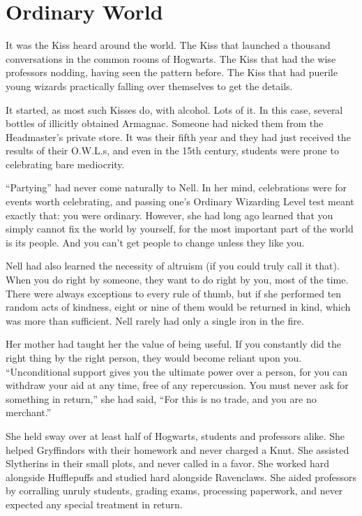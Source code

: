 \chapter{Ordinary World}


It was the Kiss heard around the world. The Kiss that launched a thousand conversations in the common rooms of Hogwarts. The Kiss that had the wise professors nodding, having seen the pattern before. The Kiss that had puerile young wizards practically falling over themselves to get the details.

It started, as most such Kisses do, with alcohol. Lots of it. In this case, several bottles of illicitly obtained Armagnac. Someone had nicked them from the Headmaster’s private store. It was their fifth year and they had just received the results of their O.W.L.s, and even in the 15th century, students were prone to celebrating bare mediocrity.

“Partying” had never come naturally to Nell. In her mind, celebrations were for events worth celebrating, and passing one’s Ordinary Wizarding Level test meant exactly that: you were ordinary. However, she had long ago learned that you simply cannot fix the world by yourself, for the most important part of the world is its people. And you can’t get people to change unless they like you.

Nell had also learned the necessity of altruism (if you could truly call it that). When you do right by someone, they want to do right by you, most of the time. There were always exceptions to every rule of thumb, but if she performed ten random acts of kindness, eight or nine of them would be returned in kind, which was more than sufficient. Nell rarely had only a single iron in the fire.

Her mother had taught her the value of being useful. If you constantly did the right thing by the right person, they would become reliant upon you. “Unconditional support gives you the ultimate power over a person, for you can withdraw your aid at any time, free of any repercussion. You must never ask for something in return,” she had said, “For this is no trade, and you are no merchant.”

She held sway over at least half of Hogwarts, students and professors alike. She helped Gryffindors with their homework and never charged a Knut. She assisted Slytherins in their small plots, and never called in a favor. She worked hard alongside Hufflepuffs and studied hard alongside Ravenclaws. She aided professors by corralling unruly students, grading exams, processing paperwork, and never expected any special treatment in return.

